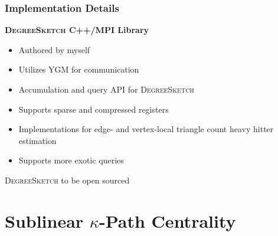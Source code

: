 \documentclass{beamer}
\newcommand{\algoname}[1]{\textnormal{\textsc{#1}}}
\begin{document}

\begin{frame}
\frametitle{Implementation Details}


\textbf{\algoname{DegreeSketch} C++/MPI Library}
\begin{itemize}
	\item Authored by myself
	\item Utilizes \algoname{YGM} for communication
	\item Accumulation and query API for \algoname{DegreeSketch}
	\item Supports sparse and compressed registers
	\item Implementations for edge- and vertex-local triangle count heavy hitter estimation
	\item Supports more exotic queries
\end{itemize}

\begin{block}{}
	\begin{center}
		\algoname{DegreeSketch} to be open sourced	
	\end{center}
\end{block}

\end{frame}


\section{Sublinear $\kappa$-Path Centrality}
\end{document}
